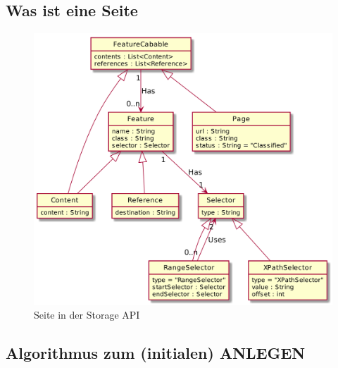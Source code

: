         \subsection{Was ist eine Seite}
            \begin{figure}
                \centering
                \includegraphics[width=\textwidth]{../resources/storage-api-data-model/page.png}
                \caption{Seite in der Storage API}
                \label{image:storageApiPageModel}
            \end{figure}
        
        \subsection{Algorithmus zum (initialen) ANLEGEN}
            